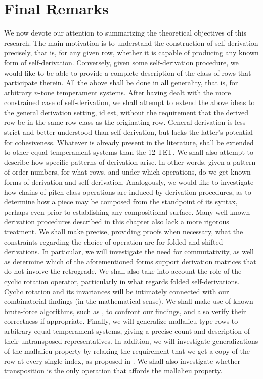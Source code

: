 \section{Final Remarks}

We now devote our attention to summarizing the theoretical objectives of this research. The main motivation is to understand the construction of self-derivation precisely, that is, for any given row, whether it is capable of producing any known form of self-derivation. Conversely, given some self-derivation procedure, we would like to be able to provide a complete description of the class of rows that participate therein. All the above shall be done in all generality, that is, for arbitrary $n$-tone temperament systems. After having dealt with the more constrained case of self-derivation, we shall attempt to extend the above ideas to the general derivation setting, id est, without the requirement that the derived row be in the same row class as the originating row. General derivation is less strict and better understood than self-derivation, but lacks the latter's potential for cohesiveness. Whatever is already present in the literature, shall be extended to other equal temperament systems than the 12-TET. We shall also attempt to describe how specific patterns of derivation arise. In other words, given a pattern of order numbers, for what rows, and under which operations, do we get known forms of derivation and self-derivation. Analogously, we would like to investigate how chains of pitch-class operations are induced by derivation procedures, as to determine how a piece may be composed from the standpoint of its syntax, perhaps even prior to establishing any compositional surface. Many well-known derivation procedures described in this chapter also lack a more rigorous treatment. We shall make precise, providing proofs when necessary, what the constraints regarding the choice of operation are for folded and shifted derivations. In particular, we will investigate the need for commutativity, as well as determine which of the aforementioned forms support derivation matrices that do not involve the retrograde. We shall also take into account the role of the cyclic rotation operator, particularly in what regards folded self-derivations. Cyclic rotation and its invariances will be intimately connected with our combinatorial findings (in the mathematical sense). We shall make use of known brute-force algorithms, such as \cite{Kowalski1987b}, to confront our findings, and also verify their correctness if appropriate. Finally, we will generalize mallalieu-type rows to arbitrary equal temperament systems, giving a precise count and description of their untransposed representatives. In addition, we will investigate generalizations of the mallalieu property by relaxing the requirement that we get a copy of the row at every single index, as proposed in \cite{Mead1989}. We shall also investigate whether transposition is the only operation that affords the mallalieu property.

